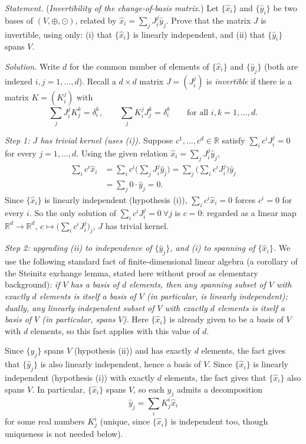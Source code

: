 \documentclass[11pt]{article}
\newcommand{\Vsp}{(V, \oplus, \odot)}
\begin{document}
\noindent\textit{Statement.} (\textit{Invertibility of the change-of-basis matrix.})
Let $\{\hat{x}_i\}$ and $\{\hat{y}_i\}$ be two bases of $\Vsp$, related by $\hat{x}_i = \sum_j J_i^j \hat{y}_j$. Prove that the matrix $J$ is invertible, using only: (i) that $\{\hat{x}_i\}$ is linearly independent, and (ii) that $\{\hat{y}_i\}$ spans $V$.

\medskip
\noindent\textit{Solution.} Write $d$ for the common number of elements of $\{\hat x_i\}$ and $\{\hat y_j\}$ (both are indexed $i,j=1,\dots,d$). Recall a $d\times d$ matrix $J=(J_i^j)$ is \emph{invertible} if there is a matrix $K=(K_i^j)$ with
\[
\sum_jJ_i^jK_j^k=\delta_i^k, \qquad \sum_jK_i^jJ_j^k=\delta_i^k \qquad \text{for all } i,k=1,\dots,d.
\]

\emph{Step 1: $J$ has trivial kernel (uses (i)).} Suppose $c^1,\dots,c^d\in\mathbb R$ satisfy $\sum_ic^iJ_i^j=0$ for every $j=1,\dots,d$. Using the given relation $\hat x_i=\sum_jJ_i^j\hat y_j$,
\begin{align*}
\sum_ic^i\hat x_i &=\sum_ic^i\Big(\sum_jJ_i^j\hat y_j\Big) =\sum_j\Big(\sum_ic^iJ_i^j\Big)\hat y_j \\
&=\sum_j0\cdot\hat y_j=0.
\end{align*}
Since $\{\hat x_i\}$ is linearly independent (hypothesis (i)), $\sum_ic^i\hat x_i=0$ forces $c^i=0$ for every $i$. So the only solution of $\sum_ic^iJ_i^j=0\ \forall j$ is $c=0$: regarded as a linear map $\mathbb R^d\to\mathbb R^d$, $c\mapsto\big(\sum_ic^iJ_i^j\big)_j$, $J$ has trivial kernel.

\emph{Step 2: upgrading (ii) to independence of $\{\hat y_j\}$, and (i) to spanning of $\{\hat x_i\}$.} We use the following standard fact of finite-dimensional linear algebra (a corollary of the Steinitz exchange lemma, stated here without proof as elementary background): \emph{if $V$ has a basis of $d$ elements, then any spanning subset of $V$ with exactly $d$ elements is itself a basis of $V$ (in particular, is linearly independent); dually, any linearly independent subset of $V$ with exactly $d$ elements is itself a basis of $V$ (in particular, spans $V$).} Here $\{\hat x_i\}$ is already given to be a basis of $V$ with $d$ elements, so this fact applies with this value of $d$.

Since $\{\hat y_j\}$ spans $V$ (hypothesis (ii)) and has exactly $d$ elements, the fact gives that $\{\hat y_j\}$ is also linearly independent, hence a basis of $V$. Since $\{\hat x_i\}$ is linearly independent (hypothesis (i)) with exactly $d$ elements, the fact gives that $\{\hat x_i\}$ also spans $V$. In particular, $\{\hat x_i\}$ spans $V$, so each $\hat y_j$ admits a decomposition
\[
\hat y_j=\sum_iK_j^i\hat x_i
\]
for some real numbers $K_j^i$ (unique, since $\{\hat x_i\}$ is independent too, though uniqueness is not needed below).
\end{document}

